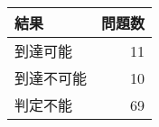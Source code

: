 \begin{tabular}{l|r} \hline
  結果 & 問題数 \\ \hline
  到達可能 & 11 \\ 
  到達不可能 & 10 \\
  判定不能 & 69 \\ \hline
\end{tabular}